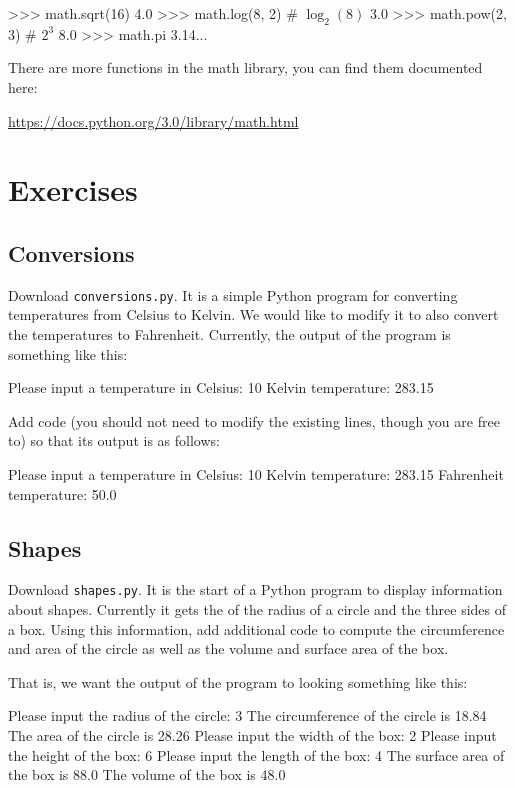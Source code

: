 \documentclass[11pt]{cselabheader}
\begin{document}
\begin{pyconcode}
>>> math.sqrt(16)
4.0
>>> math.log(8, 2) # $\log_2(8)$
3.0
>>> math.pow(2, 3) # $2^3$
8.0
>>> math.pi
3.14...
\end{pyconcode}

There are more functions in the math library, you can find them documented here:
\begin{center}
\url{https://docs.python.org/3.0/library/math.html}
\end{center}

\pagebreak

\section{Exercises}
\subsection{Conversions}
Download \texttt{conversions.py}. It is a simple Python program for converting
temperatures from Celsius to Kelvin. We would like to modify it to also convert
the temperatures to Fahrenheit. Currently, the output of the program is
something like this:

\begin{verbatimcode}
Please input a temperature in Celsius: 10
Kelvin temperature: 283.15
\end{verbatimcode}

Add code (you should not need to modify the existing lines, though you are free
to) so that its output is as follows:

\begin{verbatimcode}
Please input a temperature in Celsius: 10
Kelvin temperature: 283.15
Fahrenheit temperature: 50.0
\end{verbatimcode}

\subsection{Shapes}
Download \texttt{shapes.py}. It is the start of a Python program to display
information about shapes. Currently it gets the of the radius of a circle and
the three sides of a box. Using this information, add additional code to compute
the circumference and area of the circle as well as the volume and surface area
of the box.

That is, we want the output of the program to looking something like this:

\begin{verbatimcode}
Please input the radius of the circle: 3
The circumference of the circle is 18.84
The area of the circle is 28.26
Please input the width of the box: 2
Please input the height of the box: 6
Please input the length of the box: 4
The surface area of the box is 88.0
The volume of the box is 48.0
\end{verbatimcode}
\end{document}
